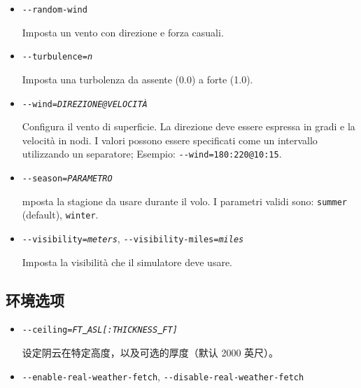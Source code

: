 \begin{itemize}
{\begin{itemize}
  Utilizza una stringa METAR specifica, ad esempio \texttt{-$ $-metar="XXXX 012345Z 00000KT 99SM CLR 19/M01 A2992"}.
  Il METAR pu\`{o} essere specificato nei formati pi\`{u} comuni (Stati Uniti, Europa). Incompatibile con
  \texttt{-$ $-enable-real-weather-fetch}.

  \item{\texttt{-$ $-random-wind}}

  Imposta un vento con direzione e forza casuali.

  \item{\texttt{-$ $-turbulence={\it n}}}

  Imposta una turbolenza da assente (0.0) a forte (1.0).

  \item{\texttt{-$ $-wind={\it DIREZIONE@VELOCIT\`{A}}}}

  Configura il vento di superficie. La direzione deve essere espressa in gradi e la velocit\`{a} in nodi.
  I valori possono essere specificati come un intervallo utilizzando un separatore;
  Esempio: \texttt{-$ $-wind=180:220@10:15}.

  \item{\texttt{-$ $-season={\it PARAMETRO}}}

  mposta la stagione da usare durante il volo. I parametri validi sono: \texttt{summer} (default), \texttt{winter}.

  \item{\texttt{-$ $-visibility={\it meters}}, \texttt{-$ $-visibility-miles={\it miles}}}

  Imposta la visibilit\`{a} che il simulatore deve usare.

  \end{itemize}
}

\ifchinese
{
  \subsection{环境选项}
\begin{itemize}
\item{\texttt{-$ $-ceiling={\it FT\underline{~}ASL[:THICKNESS\underline{~}FT]}}}
 
   设定阴云在特定高度，以及可选的厚度（默认 2000 英尺）。

\item{\texttt{-$ $-enable-real-weather-fetch}, \texttt{-$ $-disable-real-weather-fetch}}


\end{itemize}}
\end{itemize}

